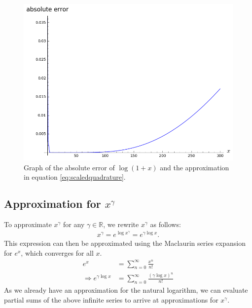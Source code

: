 \begin{figure}[!ht]
    \centering
    \includegraphics[width=.9\linewidth]{figures/ModifiedQuadratureAbsoluteError.png}
    \caption{Graph of the absolute error of $\log{(1+x)}$ and the approximation in equation \ref{eq:scaledquadrature}.}
    \label{fig:scaledquadrature}
\end{figure}

\subsection{Approximation for $x^\gamma$}
To approximate $x^\gamma$ for any $\gamma \in \mathbb{R}$, we rewrite $x^\gamma$ as follows:
\begin{align*}
  x^\gamma = e^{\log{x^\gamma}} = e^{\gamma\log{x}}.
\end{align*}
This expression can then be approximated using the Maclaurin series expansion for $e^x$, which converges for all $x$.
\begin{align*}
  e^x &= \sum_{n=0}^{\infty}{\frac{x^n}{n!}}\\
  \Rightarrow e^{\gamma\log{x}} &= \sum_{n=0}^{\infty}{\frac{(\gamma\log{x})^n}{n!}}
\end{align*}
As we already have an approximation for the natural logarithm, we can evaluate partial sums of the above infinite series to arrive at approximations for $x^\gamma$.
